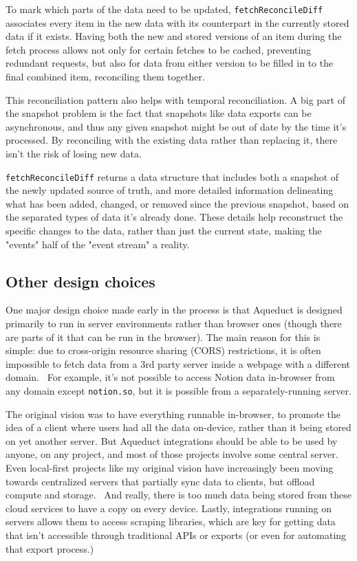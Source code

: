 \documentclass[manuscript,review,anonymous]{acmart}
\begin{document}
To mark which parts of the data need to be updated, \texttt{fetchReconcileDiff} associates every item in the new data with its counterpart in the currently stored data if it exists. Having both the new and stored versions of an item during the fetch process allows not only for certain fetches to be cached, preventing redundant requests, but also for data from either version to be filled in to the final combined item, reconciling them together.

This reconciliation pattern also helps with temporal reconciliation. A big part of the snapshot problem is the fact that snapshots like data exports can be asynchronous, and thus any given snapshot might be out of date by the time it's processed. By reconciling with the existing data rather than replacing it, there isn't the risk of losing new data. 

\texttt{fetchReconcileDiff} returns a data structure that includes both a snapshot of the newly updated source of truth, and more detailed information delineating what has been added, changed, or removed since the previous snapshot, based on the separated types of data it's already done. These details help reconstruct the specific changes to the data, rather than just the current state, making the "events" half of the "event stream" a reality.

\subsection{Other design choices}
One major design choice made early in the process is that Aqueduct is designed primarily to run in server environments rather than browser ones (though there are parts of it that can be run in the browser). The main reason for this is simple: due to cross-origin resource sharing (CORS) restrictions, it is often impossible to fetch data from a 3rd party server inside a webpage with a different domain.~\cite{mozillaReasonCORSHeader2025} For example, it's not possible to access Notion data in-browser from any domain except \texttt{notion.so}, but it is possible from a separately-running server. 

The original vision was to have everything runnable in-browser, to promote the idea of a client where users had all the data on-device, rather than it being stored on yet another server. But Aqueduct integrations should be able to be used by anyone, on any project, and most of those projects involve some central server. Even local-first projects like my original vision have increasingly been moving towards centralized servers that partially sync data to clients, but offload compute and storage.~\cite{rocicorpZero} And really, there is too much data being stored from these cloud services to have a copy on every device. Lastly, integrations running on servers allows them to access scraping libraries, which are key for getting data that isn't accessible through traditional APIs or exports (or even for automating that export process.)
\end{document}

